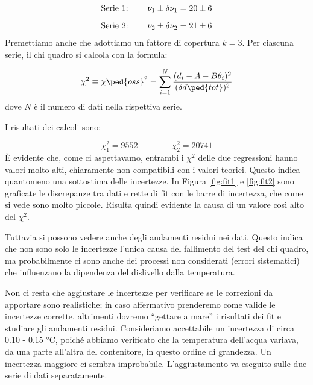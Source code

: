 \begin{equation}
    \begin{array}{l @{\hspace{0.8cm}} c}
        \text{Serie 1:} & \nu_1 \pm \delta \nu_1 = 20 \pm 6 \\[3mm]
        \text{Serie 2:} & \nu_2 \pm \delta \nu_2 = 21 \pm 6
    \end{array}
\end{equation}
%
Premettiamo anche che adottiamo un fattore di copertura $k = 3$.
Per ciascuna serie, il chi quadro si calcola con la formula:

\begin{equation}
    \chi^2 \equiv \chi\ped{oss}^2 = \sum_{i=1}^{N} \frac{(d_i - A - B\theta_i)^2}{(\delta d\ped{tot})^2}
    \label{eq:chi2}
\end{equation}
%
dove $N$ è il numero di dati nella rispettiva serie. 

I risultati dei calcoli sono:

\begin{equation}
    \chi_1^2 = 9552 \qquad \qquad \chi_2^2 = 20741
\end{equation}
%
\`E evidente che, come ci aspettavamo, entrambi i $\chi^2$ delle due regressioni hanno valori molto alti, chiaramente non compatibili con
i valori teorici. Questo indica quantomeno una sottostima delle incertezze. In Figura \ref{fig:fit1} e \ref{fig:fit2} sono
graficate le discrepanze tra dati e rette di fit con le barre di incertezza, che come si vede sono molto piccole. Risulta quindi evidente la causa di un valore così alto del $\chi^2$.

Tuttavia si possono vedere anche degli andamenti residui nei dati. Questo indica che non sono solo le incertezze l'unica
causa del fallimento del test del chi quadro, ma probabilmente ci sono anche dei processi non considerati (errori sistematici)
che influenzano la dipendenza del dislivello dalla temperatura.

Non ci resta che aggiustare le incertezze per verificare se le correzioni da apportare sono realistiche; in caso affermativo
prenderemo come valide le incertezze corrette, altrimenti dovremo ``gettare a mare'' i risultati dei fit e studiare gli
andamenti residui.
Consideriamo accettabile un incertezza di circa 0.10 - 0.15 \si{\celsius}, poiché abbiamo verificato che la temperatura dell'acqua
variava, da una parte all'altra del contenitore, in questo ordine di grandezza. Un incertezza maggiore ci sembra improbabile.
L'aggiustamento va eseguito sulle due serie di dati separatamente.


